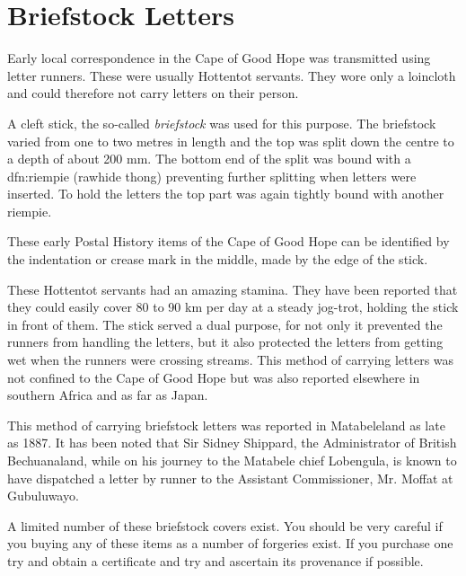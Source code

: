 \section{Briefstock Letters}

 
Early local correspondence in the Cape of Good Hope was transmitted 
using letter runners. 
These were usually Hottentot servants. 
They wore only a loincloth and could therefore not carry letters 
on their person. 


A cleft stick, the so-called \textit{briefstock}  was used for this purpose. 
The briefstock varied from one to two metres in length and the top 
was split down the centre to a depth of about 200 mm. The bottom end 
of the split was bound 
with a {{dfn:riempie}} (rawhide thong) preventing further splitting 
when letters were inserted. To hold the letters the top part was 
again tightly bound with another riempie.

These early Postal History items of the Cape of Good Hope can be 
identified by the indentation
or crease mark in the middle, made by the edge of the stick.
 
These Hottentot servants had an amazing stamina. They have been 
reported that they could easily cover 80 to 90 km per day at a 
steady jog-trot, holding the stick in front of them. The stick served 
a dual purpose, for not only it prevented the runners from handling 
the letters, but it also protected the letters from getting wet 
when the runners were crossing streams. This method of carrying 
letters was not confined to the Cape of Good Hope but was also 
reported elsewhere in southern Africa and as far as Japan.

This method of carrying briefstock letters was reported in Matabeleland 
as late as 1887. It has been noted that Sir Sidney Shippard, the 
Administrator of British Bechuanaland, while on his journey to 
the Matabele chief Lobengula, is known to have dispatched a 
letter by runner to the Assistant Commissioner, Mr. Moffat at Gubuluwayo.

A limited number of these briefstock covers exist. You should be very careful 
if you buying any of these items as a number of forgeries exist. 
If you purchase one try 
and obtain a certificate and try and ascertain its provenance if possible.

                                  